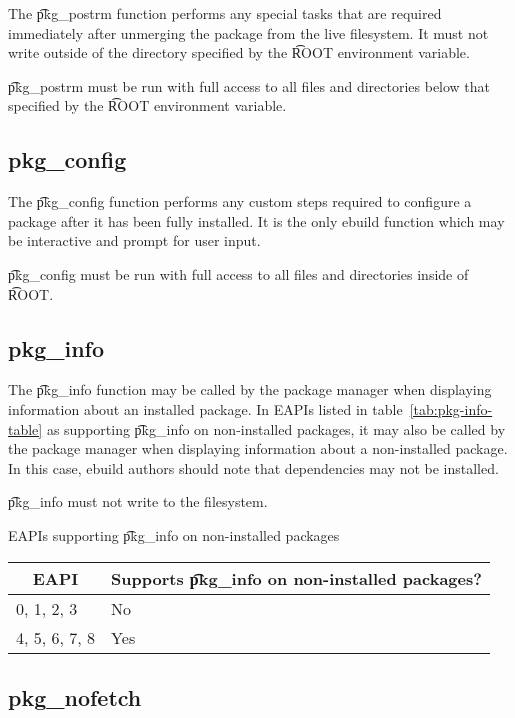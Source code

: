 The \t{pkg_postrm} function performs any special tasks that are required immediately after
unmerging the package from the live filesystem. It must not write outside of the directory specified
by the \t{ROOT} environment variable.

\t{pkg_postrm} must be run with full access to all files and directories below that specified by
the \t{ROOT} environment variable.

\subsection{pkg_config}

The \t{pkg_config} function performs any custom steps required to configure a package after it has
been fully installed. It is the only ebuild function which may be interactive and prompt for user
input.

\t{pkg_config} must be run with full access to all files and directories inside of \t{ROOT}.

\subsection{pkg_info}

 The \t{pkg_info} function may be called by the package manager when
displaying information about an installed package. In EAPIs listed in table~\ref{tab:pkg-info-table}
as supporting \t{pkg_info} on non-installed packages, it may also be called by the package manager
when displaying information about a non-installed package. In this case, ebuild authors should note
that dependencies may not be installed.

\t{pkg_info} must not write to the filesystem.

\begin{centertable}{EAPIs supporting \t{pkg_info} on non-installed packages}
    \label{tab:pkg-info-table}
    \begin{tabular}{ll}
      \toprule
      \multicolumn{1}{c}{\textbf{EAPI}} &
      \multicolumn{1}{c}{\textbf{Supports \t{pkg_info} on non-installed packages?}} \\
      \midrule
      0, 1, 2, 3        & No  \\
      4, 5, 6, 7, 8     & Yes \\
      \bottomrule
    \end{tabular}
\end{centertable}

\subsection{pkg_nofetch}

